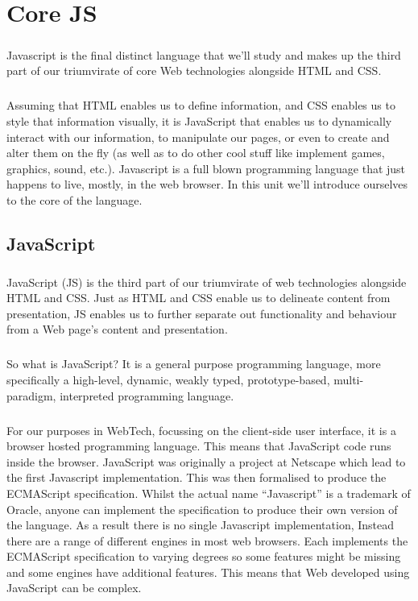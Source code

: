 \chapter{Core JS}
\label{core-js}
\paragraph{} Javascript is the final distinct language that we'll study and makes up the third part of our triumvirate of core Web technologies alongside HTML and CSS.
\paragraph{} Assuming that HTML enables us to define information, and CSS enables us to style that information visually, it is JavaScript that enables us to dynamically interact with our information, to manipulate our pages, or even to create and alter them on the fly (as well as to do other cool stuff like implement games, graphics, sound, etc.). Javascript is a full blown programming language that just happens to live, mostly, in the web browser. In this unit we'll introduce ourselves to the core of the language.

\section{JavaScript}
\paragraph{} JavaScript (JS) is the third part of our triumvirate of web technologies alongside HTML and CSS. Just as HTML and CSS enable us to delineate content from presentation, JS enables us to further separate out functionality and behaviour from a Web page’s content and presentation.

\paragraph{} So what is JavaScript? It is a general purpose programming language, more specifically a high-level, dynamic, weakly typed, prototype-based, multi-paradigm, interpreted programming language. 

\paragraph{} For our purposes in WebTech, focussing on the client-side user interface, it is a browser hosted programming language. This means that JavaScript code runs inside the browser. JavaScript was originally a project at Netscape which lead to the first Javascript implementation. This was then formalised to produce the ECMAScript specification. Whilst the actual name ``Javascript'' is a trademark of Oracle, anyone can implement the specification to produce their own version of the language. As a result there is no single Javascript implementation, Instead there are a range of different engines in most web browsers. Each implements the ECMAScript specification to varying degrees so some features might be missing and some engines have additional features. This means that Web developed using JavaScript can be complex.


